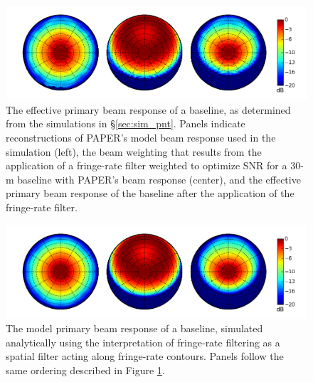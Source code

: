 \documentclass[twocolumn,apj,numberedappendix]{emulateapj}
\begin{document}
\begin{figure}\centering
\includegraphics[width=1.9\columnwidth]{plots/eff_beam.png}
\caption{
The effective primary beam response of a baseline, as determined from the simulations in \S\ref{sec:sim_pnt}.
Panels indicate reconstructions of PAPER's model beam response used in the simulation (left), the 
beam weighting that results from the application of a fringe-rate filter weighted to optimize SNR for
a 30-m baseline with PAPER's beam response (center), and the effective primary beam response of the
baseline after the application of the fringe-rate filter.
}\label{fig:eff_beam}
\end{figure}

\begin{figure}\centering
\includegraphics[width=1.9\columnwidth]{plots/sim_beam.png}
\caption{
The model primary beam response of a baseline, simulated analytically using the interpretation
of fringe-rate filtering as a spatial filter acting along fringe-rate contours.  Panels follow
the same ordering described in Figure \ref{fig:eff_beam}.
}\label{fig:sim_beam}
\end{figure}
\end{document}
